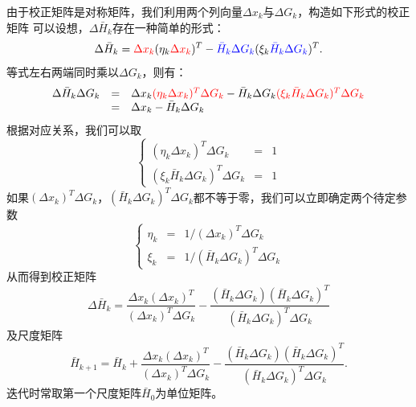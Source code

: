 由于校正矩阵是对称矩阵，我们利用两个列向量$\Delta x_k$与$\Delta G_k$，构造如下形式的校正矩阵
可以设想，$\Delta \bar{H}_k$存在一种简单的形式：
\begin{equation}
    \Delta \bar{H}_k = \textcolor{red}{\Delta x_k} (\eta_k \textcolor{red}{\Delta x_k})^T - \textcolor{blue}{\bar{H}_k \Delta G_k} (\xi_k \textcolor{blue}{\bar{H}_k \Delta G_k})^T.
\end{equation}
等式左右两端同时乘以$\Delta G_k$，则有：
\begin{equation}
    \begin{array}{lll}
      \Delta \bar{H}_k \Delta G_k & = & \Delta x_k \textcolor{red}{(\eta_k \Delta x_k)^T \Delta G_k} - \bar{H}_k \Delta G_k \textcolor{red}{(\xi_k \bar{H}_k \Delta G_k)^T \Delta G_k} \\
       & = & \Delta x_k - \bar{H}_k \Delta G_k
    \end{array}
\end{equation}
根据对应关系，我们可以取
\begin{equation}
\left\{
    \begin{array}{lll}
        (\eta_k \Delta x_k)^T \Delta G_k  & = & 1 \\
        (\xi_k \bar{H}_k \Delta G_k)^T \Delta G_k & = & 1
    \end{array}
\right.
\end{equation}
如果$(\Delta x_k)^T \Delta G_k$，$(\bar{H}_k \Delta G_k)^T \Delta G_k$都不等于零，我们可以立即确定两个待定参数
\begin{equation}
    \left\{
        \begin{array}{lll}
          \eta_k & = & 1/(\Delta x_k)^T \Delta G_k \\
          \xi_k & = & 1/(\bar{H}_k \Delta G_k)^T \Delta G_k
        \end{array}
    \right.
\end{equation}
从而得到校正矩阵
\begin{equation}
    \Delta \bar{H}_k = \frac{\Delta x_k (\Delta x_k)^T}{(\Delta x_k)^T \Delta G_k} - \frac{(\bar{H}_k \Delta G_k) (\bar{H}_k \Delta G_k)^T }{(\bar{H}_k \Delta G_k)^T \Delta G_k}
\end{equation}
及尺度矩阵
\begin{equation}\label{eq:scalematrix}
    \bar{H}_{k+1} = \bar{H}_k + \frac{\Delta x_k (\Delta x_k)^T}{(\Delta x_k)^T \Delta G_k} - \frac{(\bar{H}_k \Delta G_k) (\bar{H}_k \Delta G_k)^T }{(\bar{H}_k \Delta G_k)^T \Delta G_k}.
\end{equation}
迭代时常取第一个尺度矩阵$\bar{H}_0$为单位矩阵。

